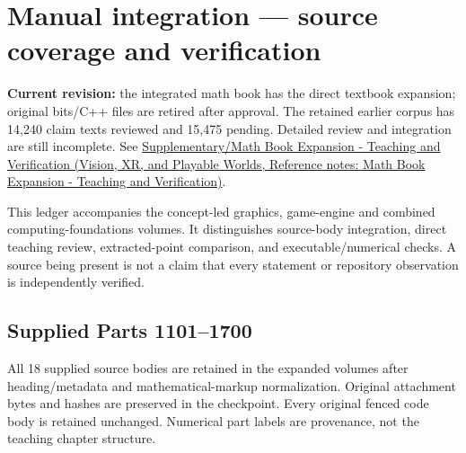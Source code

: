 \hypertarget{appendix-3b67654799a2}{}\label{referencestart:appendix-3b67654799a2}
\section{Manual integration --- source coverage and verification}\label{appendix-3b67654799a2-manual-integration-source-coverage-and-verification}

\textbf{Current revision:} the integrated math book has the direct textbook expansion; original bits/C++ files are retired after approval. The retained earlier corpus has 14,240 claim texts reviewed and 15,475 pending. Detailed review and integration are still incomplete. See \href{../07-Vision-XR-and-Playable-Worlds/main.pdf\#nameddest=appendix-5056f3debc1f}{Supplementary/Math Book Expansion - Teaching and Verification (Vision, XR, and Playable Worlds, Reference notes: Math Book Expansion - Teaching and Verification)}.

This ledger accompanies the concept-led graphics, game-engine and combined computing-foundations volumes. It distinguishes source-body integration, direct teaching review, extracted-point comparison, and executable/numerical checks. A source being present is not a claim that every statement or repository observation is independently verified.

\subsection{Supplied Parts 1101--1700}\label{appendix-3b67654799a2-supplied-parts-11011700}

All 18 supplied source bodies are retained in the expanded volumes after heading/metadata and mathematical-markup normalization. Original attachment bytes and hashes are preserved in the checkpoint. Every original fenced code body is retained unchanged. Numerical part labels are provenance, not the teaching chapter structure.

